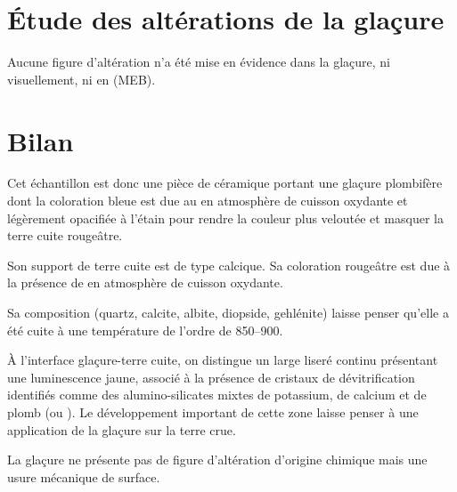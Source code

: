 \section{Étude des altérations de la glaçure}

Aucune figure d'altération n'a été mise en évidence dans la glaçure, 
ni visuellement, ni en \MEB[ie] (MEB).


\section{Bilan}

Cet échantillon est donc une pièce de céramique portant une glaçure plombifère dont la coloration bleue est due au  en atmosphère de cuisson oxydante et légèrement opacifiée à l'étain pour rendre la couleur plus veloutée et masquer la terre cuite rougeâtre.

Son support de terre cuite est de type calcique. Sa coloration rougeâtre est due à la présence de  en atmosphère de cuisson oxydante.

Sa composition \cristallo (quartz, calcite, albite, diopside, gehlénite) laisse penser qu'elle a été cuite à une température de l'ordre de \SIrange[range-phrase=\ à\ ]{850}{900}{\degC}.

À l'interface glaçure-terre cuite, on distingue un large liseré 
continu présentant une luminescence jaune, associé à la présence de 
cristaux de dévitrification identifiés comme des alumino-silicates 
mixtes de potassium, de calcium et de plomb (ou ). Le développement important de cette zone laisse penser à
une application de la glaçure sur la terre crue.

La glaçure ne présente pas de figure d'altération d'origine chimique 
mais une usure mécanique de surface.
